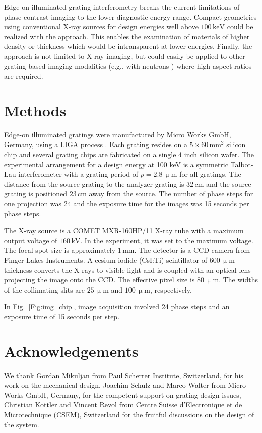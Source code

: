 \documentclass[aip,apl,amsmath,amssymb,floatfix,reprint,a4paper]{revtex4-1}
\newcommand{\unit}[1]{\ensuremath{\, \mathrm{#1}}}
\begin{document}
Edge-on illuminated grating interferometry breaks the current limitations of phase-contrast imaging to the lower diagnostic energy range. Compact geometries  using conventional X-ray sources for design energies well above $100 \unit{keV}$ could be realized with the approach. This enables the examination of materials of higher density or thickness which would be intransparent at lower energies. Finally, the approach is not limited to X-ray imaging, but could easily be applied to other grating-based imaging modalities (e.g., with neutrons \cite{Grunzweig2008}) where high aspect ratios are required.

\section*{Methods}
Edge-on illuminated gratings were manufactured by Micro Works GmbH, Germany, using a LIGA process \cite{Kenntner2010}. Each grating resides on a $5 \times 60 \unit{mm^2}$ silicon chip and several grating chips are fabricated on a single 4 inch silicon wafer. The experimental arrangement for a design energy at 100 keV is a symmetric Talbot-Lau interferometer with a grating period of $p = 2.8 \unit{\upmu m}$ for all gratings. The distance from the source grating to the analyzer grating is $32 \unit{cm}$ and the source grating is positioned $23 \unit{cm}$ away from the source. The number of phase steps for one projection was 24 \cite{Weitkamp2005} and the exposure time for the images was 15 seconds per phase steps.

The X-ray source is a COMET MXR-160HP/11 X-ray tube with a maximum output voltage of $160 \unit{kV}$. In the experiment, it was set to the maximum voltage. The focal spot size is approximately $1 \unit{mm}$. The detector is a CCD camera from Finger Lakes Instruments. A cesium iodide (CsI:Ti) scintillator of $600 \unit{\upmu m}$ thickness converts the X-rays to visible light and is coupled with an optical lens projecting the image onto the CCD. The effective pixel size is $80 \unit{\upmu m}$. The widths of the collimating slits are $25 \unit{\upmu m}$ and $100 \unit{\upmu m}$, respectively.

In Fig.~\ref{Fig:img_chip}, image acquisition involved 24 phase steps \cite{Weitkamp2005} and an exposure time of 15 seconds per step.

\section*{Acknowledgements}
We thank Gordan Mikuljan from Paul Scherrer Institute, Switzerland, for his work on the mechanical design, Joachim Schulz and Marco Walter from Micro Works GmbH, Germany, for the competent support on grating design issues, Christian Kottler and Vincent Revol from Centre Suisse d'Electronique et de Microtechnique (CSEM), Switzerland for the fruitful discussions on the design of the system.




\end{document}
